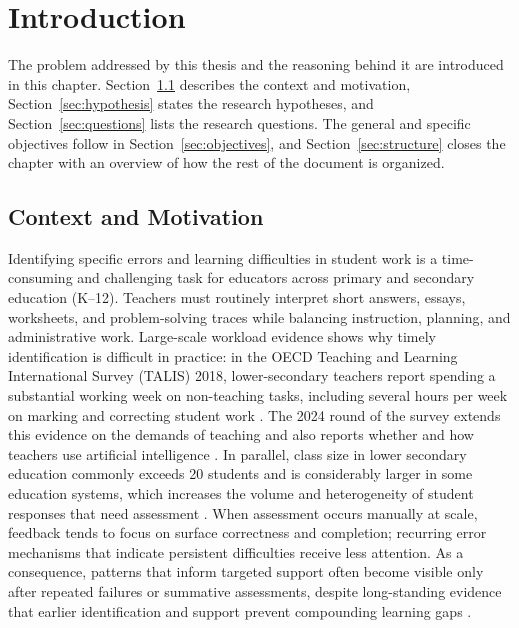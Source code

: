 % 
\chapter{Introduction} %
\label{chap:introduction} %

The problem addressed by this thesis and the reasoning behind it are introduced in this chapter. Section~\ref{sec:context_motivation} describes the context and motivation, Section~\ref{sec:hypothesis} states the research hypotheses, and Section~\ref{sec:questions} lists the research questions. The general and specific objectives follow in Section~\ref{sec:objectives}, and Section~\ref{sec:structure} closes the chapter with an overview of how the rest of the document is organized.

%
\section{Context and Motivation} 
\label{sec:context_motivation}

Identifying specific errors and learning difficulties in student work is a time-consuming and challenging task for educators across primary and secondary education (K--12). Teachers must routinely interpret short answers, essays, worksheets, and problem-solving traces while balancing instruction, planning, and administrative work. Large-scale workload evidence shows why timely identification is difficult in practice: in the OECD Teaching and Learning International Survey (TALIS) 2018, lower-secondary teachers report spending a substantial working week on non-teaching tasks, including several hours per week on marking and correcting student work \parencite{OECDTALIS2018VolI}. The 2024 round of the survey extends this evidence on the demands of teaching and also reports whether and how teachers use artificial intelligence \parencite{OECDTALIS2024}. In parallel, class size in lower secondary education commonly exceeds 20 students and is considerably larger in some education systems, which increases the volume and heterogeneity of student responses that need assessment \parencite{OECDEAG2019}. When assessment occurs manually at scale, feedback tends to focus on surface correctness and completion; recurring error mechanisms that indicate persistent difficulties receive less attention. As a consequence, patterns that inform targeted support often become visible only after repeated failures or summative assessments, despite long-standing evidence that earlier identification and support prevent compounding learning gaps \parencite{SnowBurnsGriffin1998}.

